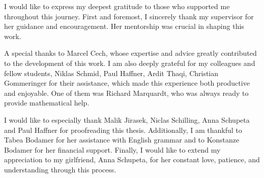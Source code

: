 
\begin{acknowledgements}
\addchaptertocentry{\acknowledgementname}
I would like to express my deepest gratitude to those who supported me throughout this journey.
First and foremost, I sincerely thank my supervisor \supname for her guidance and encouragement.
Her mentorship was crucial in shaping this work.

\noindent
A special thanks to Marcel Cech, whose expertise and advice greatly contributed to the development of this work.
I am also deeply grateful for my colleagues and fellow students,
Niklas Schmid, Paul Haffner, Ardit Thaqi, Christian Gommeringer for their assistance,
which made this experience both productive and enjoyable.
One of them was Richard Marquardt, who was always ready to provide mathematical help.

\noindent
I would like to especially thank Malik Jirasek, Niclas Schilling, Anna Schupeta and Paul Haffner for proofreading this thesis.
Additionally,
I am thankful to Tabea Bodamer for her assistance with English grammar and to Konstanze Bodamer for her financial support.
\noindent
Finally, I would like to extend my appreciation to my girlfriend, Anna Schupeta, for her constant love, patience,
and understanding through this process.

\end{acknowledgements}


\tableofcontents %



%
%

